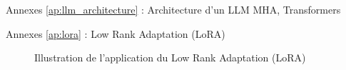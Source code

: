 \begin{frame}{Annexes \ref{ap:llm_architecture} : Architecture d'un LLM}
    \label{ap:llm_architecture}
    MHA, Transformers
    
\end{frame}

\begin{frame}{Annexes \ref{ap:lora} : Low Rank Adaptation (LoRA)}
    \label{ap:lora}
    \begin{figure}
        \centering
        
        \caption{Illustration de l'application du Low Rank Adaptation (LoRA)}
    \end{figure}
    
\end{frame}
